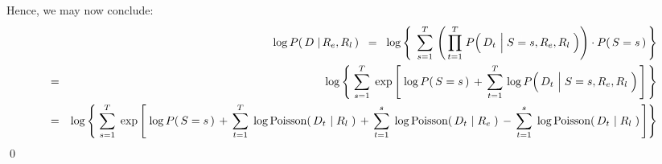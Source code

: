 Hence, we may now conclude:
\begin{eqnarray*}
&&
	\log P\!\left(\,D \;\vert\, R_{e},R_{l}\,\right)
\;\; = \;\;
	\log\left\{\;\,
	\overset{T}{\underset{s=1}{\sum}}\,
		\left(\,
			\overset{T}{\underset{t=1}{\prod}}\;
			P\!\left(\,D_{t} \,\left\vert\; S\overset{{\color{white}1}}{=}s,R_{e},R_{l}\right.\,\right)
			\right)
		\cdot
		P\!\left(\,S=s\,\right)
	\,\right\}
\\
& = &
	\log\left\{\;
	\overset{T}{\underset{s=1}{\sum}}\;
	\exp\left[\;
		\log P\!\left(\,S=s\,\right)
		\, + \,
		\overset{T}{\underset{t=1}{\sum}}\,
		\log P\!\left(\,D_{t} \,\left\vert\; S\overset{{\color{white}1}}{=}s,R_{e},R_{l}\right.\,\right)
		\,\right]
	\,\right\}
\\
&=&
	\log\left\{\;
	\overset{T}{\underset{s=1}{\sum}}\;
	\exp\left[\;
			\log P\!\left(\,S=s\,\right)
			\,+\,
			\overset{T}{\underset{t=1}{\sum}}\;
			\log\textnormal{Poisson}\!\left(\,D_{t} \,\left\vert\; R_{l}\right.\,\right)
			\,+\,
			\overset{s}{\underset{t=1}{\sum}}\;
			\log\textnormal{Poisson}\!\left(\,D_{t} \,\left\vert\; R_{e}\right.\,\right)
			\,-\,
			\overset{s}{\underset{t=1}{\sum}}\;
			\log\textnormal{Poisson}\!\left(\,D_{t} \,\left\vert\; R_{l}\right.\,\right)
		\,\right]
	\right\}
\end{eqnarray*}
\qed


